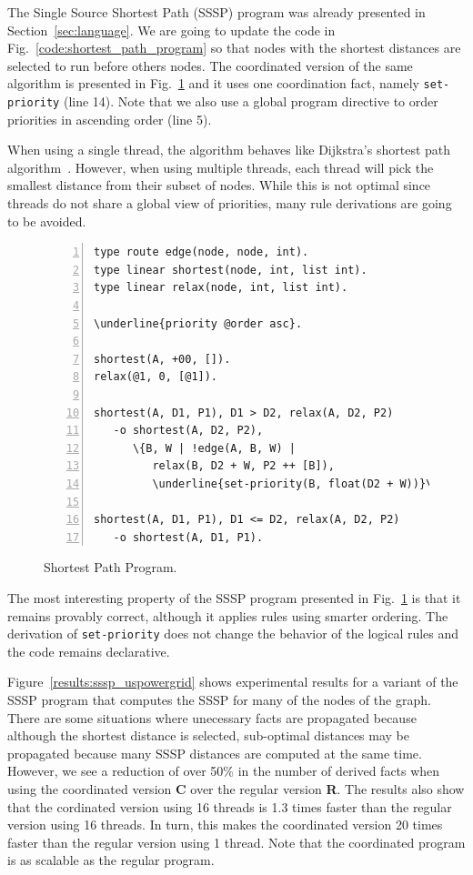 The Single Source Shortest Path (SSSP) program was already presented in
Section~\ref{sec:language}. We are going to update the code in
Fig.~\ref{code:shortest_path_program} so that nodes with the shortest distances
are selected to run before others nodes. The coordinated version of the same
algorithm is presented in Fig.~\ref{code:shortest_path_program_coord} and it
uses one coordination fact, namely \texttt{set-priority} (line 14). Note that we
also use a global program directive to order priorities in ascending order (line
5).

When using a single thread, the algorithm behaves like
Dijkstra's shortest path algorithm~\cite{Dijkstra}. However, when using multiple
threads, each thread will pick the smallest distance from their subset of nodes.
While this is not optimal since threads do not share a global view of priorities,
many rule derivations are going to be avoided.

\begin{figure}[h!]
\scriptsize\begin{Verbatim}[numbers=left,commandchars=\\\{\}]
type route edge(node, node, int).
type linear shortest(node, int, list int).
type linear relax(node, int, list int).

\underline{priority @order asc}.

shortest(A, +00, []).
relax(@1, 0, [@1]).

shortest(A, D1, P1), D1 > D2, relax(A, D2, P2)
   -o shortest(A, D2, P2),
      \{B, W | !edge(A, B, W) |
         relax(B, D2 + W, P2 ++ [B]),
         \underline{set-priority(B, float(D2 + W))}\}.

shortest(A, D1, P1), D1 <= D2, relax(A, D2, P2)
   -o shortest(A, D1, P1).
\end{Verbatim}
  \caption{Shortest Path Program.}
  \label{code:shortest_path_program_coord}
\end{figure}
\normalsize

The most interesting property of the SSSP program presented in
Fig.~\ref{code:shortest_path_program_coord} is that it remains provably correct,
although it applies rules using smarter ordering. The derivation of
\texttt{set-priority} does not change the behavior of the logical rules and the
code remains declarative.

Figure~\ref{results:sssp_uspowergrid} shows experimental results for a variant of
the SSSP program that computes the SSSP for many of the nodes of the graph.
There are some situations where unecessary facts are propagated
because although the shortest distance is selected, sub-optimal distances may be
propagated because many SSSP distances are computed at the same time.
However, we see a reduction of over 50\% in the number of
derived facts when using the coordinated version \textbf{C} over the regular
version \textbf{R}. The results also show that the cordinated
version using 16 threads is 1.3 times faster than the regular version using 16
threads. In turn, this makes the coordinated version 20 times faster
than the regular version using 1 thread. Note that the coordinated program is as
scalable as the regular program.

